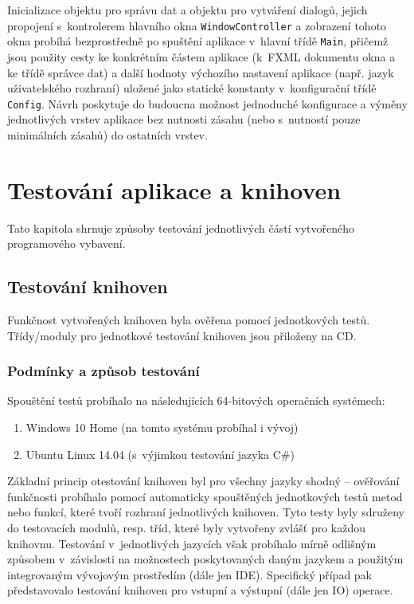 \documentclass[czech,BP]{thesiskiv}
\begin{document}
Inicializace objektu pro správu dat a objektu pro vytváření dialogů, jejich propojení s~kontrolerem hlavního okna \texttt{WindowController} a zobrazení tohoto okna probíhá bezprostředně po spuštění aplikace v~hlavní třídě \texttt{Main}, přičemž jsou použity cesty ke konkrétním částem aplikace (k~FXML dokumentu okna a ke třídě správce dat) a další hodnoty výchozího nastavení aplikace (např. jazyk uživatelského rozhraní) uložené jako statické konstanty v~konfigurační třídě \texttt{Config}. Návrh poskytuje do budoucna možnost jednoduché konfigurace a výměny jednotlivých vrstev aplikace bez nutnosti zásahu (nebo s~nutností pouze minimálních zásahů) do ostatních vrstev.

\chapter{Testování aplikace a knihoven}
Tato kapitola shrnuje způsoby testování jednotlivých částí vytvořeného programového vybavení.
\section{Testování knihoven}
Funkčnost vytvořených knihoven byla ověřena pomocí jednotkových testů. Třídy/moduly pro jednotkové testování knihoven jsou přiloženy na CD.

\subsection{Podmínky a způsob testování}
Spouštění testů probíhalo na následujících 64-bitových operačních systémech:
\begin{enumerate}
\item{Windows 10 Home (na tomto systému probíhal i vývoj)}
\item{Ubuntu Linux 14.04 (s~výjimkou testování jazyka C\#)}
\end{enumerate}

Základní princip otestování knihoven byl pro všechny jazyky shodný -- ověřování funkčnosti probíhalo pomocí automaticky spouštěných jednotkových testů metod nebo funkcí, které tvoří rozhraní jednotlivých knihoven. Tyto testy byly sdruženy do testovacích modulů, resp. tříd, které byly vytvořeny zvlášť pro každou knihovnu. Testování v~jednotlivých jazycích však probíhalo mírně odlišným způsobem v~závislosti na možnostech poskytovaných daným jazykem a použitým integrovaným vývojovým prostředím (dále jen IDE). Specifický případ pak představovalo testování knihoven pro vstupní a výstupní (dále jen IO) operace.
\end{document}
